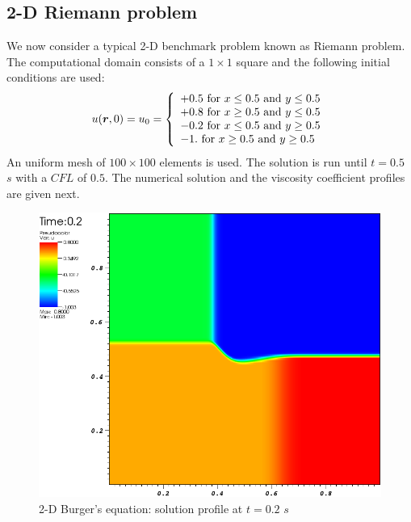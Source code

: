 \subsection{2-D Riemann problem}\label{sec:2dnum_sct2b}
We now consider a typical 2-D benchmark problem known as Riemann problem. The computational domain consists of a $1 \times 1$ square and the following initial conditions are used:
%
\begin{equation}\label{eq:bg_2d_ic_sct2b}
u(\boldsymbol r,0) = u_0 = \left\{
\begin{array}{l}
+0.5 \text{ for } x \leq 0.5 \text{ and } y \leq 0.5 \\
+0.8 \text{ for } x \geq 0.5 \text{ and } y \leq 0.5 \\
-0.2 \text{ for } x \leq 0.5 \text{ and } y \geq 0.5 \\
-1. \text{ for } x \geq 0.5 \text{ and } y \geq 0.5
\end{array}
\nonumber
\right.
\end{equation}
%
An uniform mesh of $100 \times 100$ elements is used. The solution is run until $t=0.5$ $s$ with a $CFL$ of $0.5$. The numerical solution and the viscosity coefficient profiles are given next. 
%
\begin{figure}[H]
	\centering
	\includegraphics[width=\textwidth]{figures/Burger2D_sol_t0p2.png}
	\caption{2-D Burger's equation: solution profile at $t=0.2$ $s$}
	\label{fig:2d_burger_sol_t0p2}
\end{figure}
